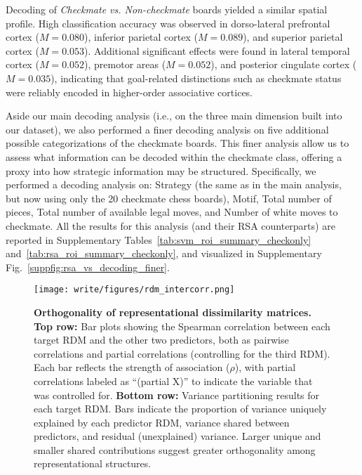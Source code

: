 Decoding of \emph{Checkmate vs. Non-checkmate} boards yielded a similar spatial profile. High classification accuracy was observed in dorso-lateral prefrontal cortex ($M = 0.080$), inferior parietal cortex ($M = 0.089$), and superior parietal cortex ($M = 0.053$). Additional significant effects were found in lateral temporal cortex ($M = 0.052$), premotor areas ($M = 0.052$), and posterior cingulate cortex ($M = 0.035$), indicating that goal-related distinctions such as checkmate status were reliably encoded in higher-order associative cortices.

Aside our main decoding analysis (i.e., on the three main dimension built into our dataset), we also performed a finer decoding analysis on five additional possible categorizations of the checkmate boards. This finer analysis allow us to assess what information can be decoded within the checkmate class, offering a proxy into how strategic information may be structured. Specifically, we performed a decoding analysis on: Strategy (the same as in the main analysis, but now using only the 20 checkmate chess boards), Motif, Total number of pieces, Total number of available legal moves, and Number of white moves to checkmate. All the results for this analysis (and their RSA counterparts) are reported in Supplementary Tables~\ref{tab:svm_roi_summary_checkonly} and~\ref{tab:rsa_roi_summary_checkonly}, and visualized in Supplementary Fig.~\ref{suppfig:rsa_vs_decoding_finer}.

\begin{figure}[!htp]
  \centering
  \texttt{[image: write/figures/rdm\_intercorr.png]}
    \caption{\textbf{Orthogonality of representational dissimilarity matrices.} 
    \textbf{Top row:} Bar plots showing the Spearman correlation between each target RDM and the other two predictors, both as pairwise correlations and partial correlations (controlling for the third RDM). Each bar reflects the strength of association ($\rho$), with partial correlations labeled as ``(partial X)'' to indicate the variable that was controlled for. 
    \textbf{Bottom row:} Variance partitioning results for each target RDM. Bars indicate the proportion of variance uniquely explained by each predictor RDM, variance shared between predictors, and residual (unexplained) variance. Larger unique and smaller shared contributions suggest greater orthogonality among representational structures.}
      \label{suppfig:rdm_orthogonality}
\end{figure}

